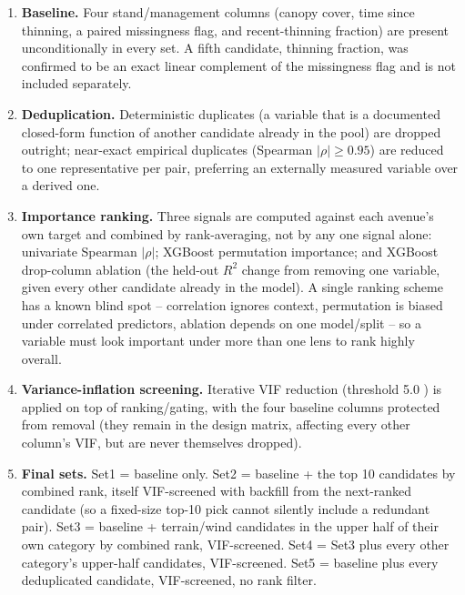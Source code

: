 \begin{enumerate}
\setlength\itemsep{0pt}
\item \textbf{Baseline.} Four stand/management columns (canopy cover, time since thinning, a
  paired missingness flag, and recent-thinning fraction) are present unconditionally in every
  set. A fifth candidate, thinning fraction, was confirmed to be an exact linear complement of
  the missingness flag and is not included separately.
\item \textbf{Deduplication.} Deterministic duplicates (a variable that is a documented closed-form
  function of another candidate already in the pool) are dropped outright; near-exact empirical
  duplicates (Spearman $|\rho|\geq0.95$) are reduced to one representative per pair, preferring an
  externally measured variable over a derived one.
\item \textbf{Importance ranking.} Three signals are computed against each avenue's own target and
  combined by rank-averaging, not by any one signal alone: univariate Spearman $|\rho|$; XGBoost
  permutation importance; and XGBoost drop-column ablation (the held-out $R^2$ change from
  removing one variable, given every other candidate already in the model). A single ranking
  scheme has a known blind spot -- correlation ignores context, permutation is biased under
  correlated predictors, ablation depends on one model/split -- so a variable must look important
  under more than one lens to rank highly overall.
\item \textbf{Variance-inflation screening.} Iterative VIF reduction (threshold 5.0
  \citep{dormann2013}) is applied on top of ranking/gating, with the four baseline columns
  protected from removal (they remain in the design matrix, affecting every other column's VIF,
  but are never themselves dropped).
\item \textbf{Final sets.} Set1 = baseline only. Set2 = baseline + the top 10 candidates by
  combined rank, itself VIF-screened with backfill from the next-ranked candidate (so a fixed-size
  top-10 pick cannot silently include a redundant pair). Set3 = baseline + terrain/wind
  candidates in the upper half of their own category by combined rank, VIF-screened. Set4 = Set3
  plus every other category's upper-half candidates, VIF-screened. Set5 = baseline plus every
  deduplicated candidate, VIF-screened, no rank filter.
\end{enumerate}

